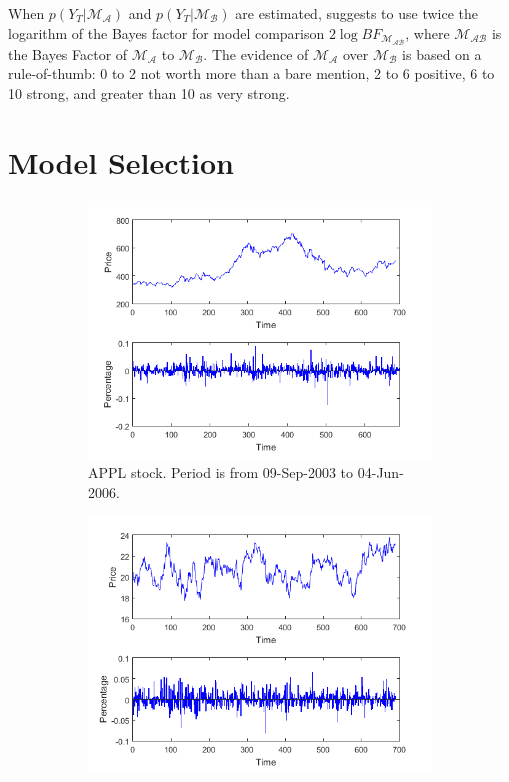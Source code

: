 \documentclass[11pt,a4,twosided,singlespacing,titlepagenumber=on]{scrreprt}
\numberwithin{equation}{chapter} %
\theoremstyle{remark}
\begin{document}
When $p(Y_T | \mathcal{M_A})$ and $p(Y_T | \mathcal{M_B})$ are estimated, \cite{kass1995} suggests to use twice the logarithm of the Bayes factor for model comparison $2 \log BF_{\mathcal{M_{AB}}}$, where $\mathcal{M_{AB}}$ is the Bayes Factor of $\mathcal{M_A}$ to $\mathcal{M_B}$. The evidence of $\mathcal{M_A}$ over $\mathcal{M_B}$ is based on a rule-of-thumb: 0 to 2 not worth more than a bare mention, 2 to 6 positive, 6 to 10 strong, and greater than 10 as very strong.


\section{Model Selection}

\begin{figure}[H]
    \centering
    \begin{subfigure}[t]{0.49\textwidth}
        \centering
        \includegraphics[width=1\textwidth]{apple_2003_2006}
        \caption{APPL stock. Period is from 09-Sep-2003 to 04-Jun-2006.}
        \label{apple_2003_2006}
    \end{subfigure}
    \begin{subfigure}[t]{0.49\textwidth}
        \centering
        \includegraphics[width=1\textwidth]{spread_amr_crane_2003_2006}

\end{subfigure}
\end{figure}
\end{document}
